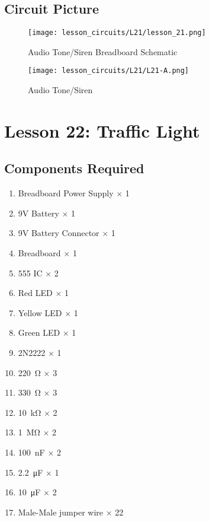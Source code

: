 \subsection{Circuit Picture}
\begin{figure}[!h]
    \centering
    \texttt{[image: lesson\_circuits/L21/lesson\_21.png]}
    \caption{Audio Tone/Siren Breadboard Schematic}
    \label{fig:555_audsi_sch}
\end{figure}
\begin{figure}[!h]
    \centering
    \texttt{[image: lesson\_circuits/L21/L21-A.png]}
    \caption{Audio Tone/Siren}
    \label{fig:555_audsi_obb}
\end{figure}
\section{Lesson 22: Traffic Light}
\subsection{Components Required}
\begin{enumerate}
    \item Breadboard Power Supply $\times$ 1
    \item 9V Battery $\times$ 1
    \item 9V Battery Connector $\times$ 1
    \item Breadboard $\times$ 1
    \item 555 IC $\times$ 2
    \item Red LED $\times$ 1
    \item Yellow LED $\times$ 1
    \item Green LED $\times$ 1
    \item 2N2222 $\times$ 1
    \item \SI{220}{\ohm} $\times$ 3
    \item \SI{330}{\ohm} $\times$ 3
    \item \SI{10}{\kilo\ohm} $\times$ 2
    \item \SI{1}{\Mohm} $\times$ 2
    \item \SI{100}{\nano\farad} $\times$ 2
    \item \SI{2.2}{\micro\farad} $\times$ 1
    \item \SI{10}{\micro\farad} $\times$ 2
    \item Male-Male jumper wire $\times$ 22
\end{enumerate}
